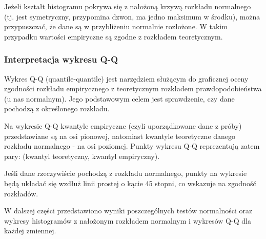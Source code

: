 \documentclass[12pt,a4paper]{article}
\begin{document}
Jeżeli kształt histogramu pokrywa się z nałożoną krzywą rozkładu normalnego (tj. jest symetryczny, przypomina dzwon, ma jedno maksimum w środku), można przypuszczać, że dane są w przybliżeniu normalnie rozłożone. W takim przypadku wartości empiryczne są zgodne z rozkładem teoretycznym.


\subsubsection*{Interpretacja wykresu Q-Q}
Wykres Q-Q (quantile-quantile) jest narzędziem służącym do graficznej oceny zgodności rozkładu empirycznego z teoretycznym rozkładem prawdopodobieństwa (u nas normalnym). Jego podstawowym celem jest sprawdzenie, czy dane pochodzą z określonego rozkładu.

Na wykresie Q-Q kwantyle empiryczne (czyli uporządkowane dane z próby) przedstawiane są na osi pionowej, natomiast kwantyle teoretyczne danego rozkładu normalnego - na osi poziomej. Punkty wykresu Q-Q reprezentują zatem pary: (kwantyl teoretyczny, kwantyl empiryczny).

 Jeśli dane rzeczywiście pochodzą z rozkładu normalnego, punkty na wykresie będą układać się wzdłuż linii prostej o kącie 45 stopni, co wskazuje na zgodność rozkładów.
 
 W dalszej części przedstawiono wyniki poszczególnych testów normalności oraz wykresy histogramów z nałożonym rozkładem normalnym i wykresów Q-Q dla każdej zmiennej.
 
\end{document}
